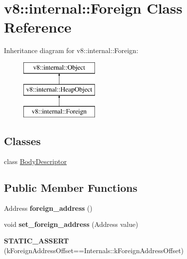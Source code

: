 \hypertarget{classv8_1_1internal_1_1_foreign}{}\section{v8\+:\+:internal\+:\+:Foreign Class Reference}
\label{classv8_1_1internal_1_1_foreign}
Inheritance diagram for v8\+:\+:internal\+:\+:Foreign\+:\begin{figure}[H]
\begin{center}
\leavevmode
\includegraphics[height=3.000000cm]{classv8_1_1internal_1_1_foreign}
\end{center}
\end{figure}
\subsection*{Classes}
\begin{DoxyCompactItemize}
\item 
class \hyperlink{classv8_1_1internal_1_1_foreign_1_1_body_descriptor}{Body\+Descriptor}
\end{DoxyCompactItemize}
\subsection*{Public Member Functions}
\begin{DoxyCompactItemize}
\item 
Address {\bfseries foreign\+\_\+address} ()\hypertarget{classv8_1_1internal_1_1_foreign_a83ec0799841a8ecfe8d629da4859b621}{}\label{classv8_1_1internal_1_1_foreign_a83ec0799841a8ecfe8d629da4859b621}

\item 
void {\bfseries set\+\_\+foreign\+\_\+address} (Address value)\hypertarget{classv8_1_1internal_1_1_foreign_ace19e115c4f5c904eedf4ac4aca3feda}{}\label{classv8_1_1internal_1_1_foreign_ace19e115c4f5c904eedf4ac4aca3feda}

\item 
{\bfseries S\+T\+A\+T\+I\+C\+\_\+\+A\+S\+S\+E\+RT} (k\+Foreign\+Address\+Offset==Internals\+::k\+Foreign\+Address\+Offset)\hypertarget{classv8_1_1internal_1_1_foreign_a045665be8925ea25c51632d5502d713e}{}\label{classv8_1_1internal_1_1_foreign_a045665be8925ea25c51632d5502d713e}

\end{DoxyCompactItemize}
